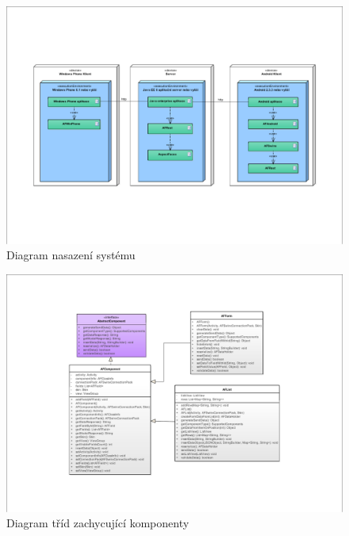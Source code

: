 \begin{figure}
\begin{center}
\includegraphics[width=\textheight, height=\textwidth, keepaspectratio, angle=270, trim=4 4 4 4, clip]{figures/deploymentDiagram}
\caption{Diagram nasazení systému}
\label{img:deploymentDiagram}
\end{center}
\end{figure}

\begin{figure}
\begin{center}
\includegraphics[width=\textheight, height=\textwidth, keepaspectratio, angle=270, trim=4 4 4 4, clip]{figures/classDiagramComponents}
\caption{Diagram tříd zachycující komponenty}
\label{img:classDiagramComponents}
\end{center}
\end{figure}

